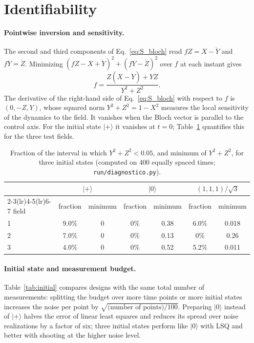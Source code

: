\documentclass[aps,pra,onecolumn,superscriptaddress,11pt,longbibliography,floatfix,nofootinbib]{revtex4-2}
\begin{document}
\section{Identifiability}\label{sec:identifiability}

\paragraph{Pointwise inversion and sensitivity.} The second and third components of
Eq.~\eqref{eq:S_bloch} read $fZ=X-\dot Y$ and $fY=\dot Z$. Minimizing $(fZ-X+\dot Y)^2+(fY-\dot Z)^2$
over $f$ at each instant gives
\begin{equation}
  f = \frac{Z(X-\dot Y)+Y\dot Z}{Y^2+Z^2}.
  \label{eq:S_direct}
\end{equation}
The derivative of the right-hand side of Eq.~\eqref{eq:S_bloch} with respect to $f$ is
$(0,-Z,Y)$, whose squared norm $Y^2+Z^2=1-X^2$ measures the local sensitivity of the dynamics to the
field. It vanishes when the Bloch vector is parallel to the control axis. For the initial state
$|+\rangle$ it vanishes at $t=0$; Table~\ref{tab:observ} quantifies this for the three test fields.

\begin{table}[h]
  \caption{Fraction of the interval in which $Y^2+Z^2<0.05$, and minimum of $Y^2+Z^2$, for three
  initial states (computed on 400 equally spaced times; \texttt{run/diagnostico.py}).}
  \label{tab:observ}
  \begin{tabular}{lcccccc}
    \toprule
    & \multicolumn{2}{c}{$|+\rangle$} & \multicolumn{2}{c}{$|0\rangle$} & \multicolumn{2}{c}{$(1,1,1)/\sqrt3$} \\
    \cmidrule(lr){2-3}\cmidrule(lr){4-5}\cmidrule(lr){6-7}
    field & fraction & minimum & fraction & minimum & fraction & minimum \\
    \midrule
    1 & 9.0\% & 0 & 0\% & 0.38 & 6.0\% & 0.018 \\
    2 & 7.0\% & 0 & 0\% & 0.13 & 0\% & 0.26 \\
    3 & 4.0\% & 0 & 0\% & 0.52 & 5.2\% & 0.011 \\
    \bottomrule
  \end{tabular}
\end{table}

\paragraph{Initial state and measurement budget.} Table~\ref{tab:initial} compares designs with the same
total number of measurements: splitting the budget over more time points or more initial states
increases the noise per point by $\sqrt{\text{(number of points)}/100}$. Preparing $|0\rangle$ instead of
$|+\rangle$ halves the error of linear least squares and reduces its spread over noise realizations by a
factor of six; three initial states perform like $|0\rangle$ with LSQ and better with shooting at the
higher noise level.
\end{document}
